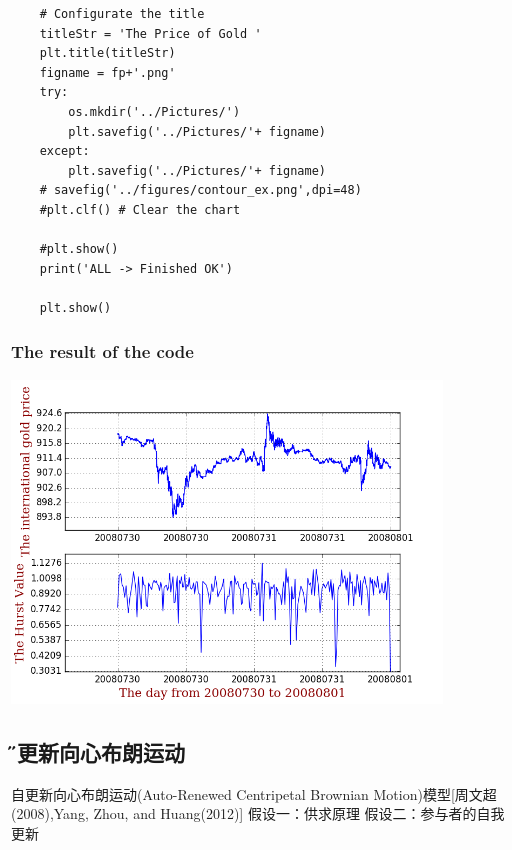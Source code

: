 \documentclass[12pt]{article}
\begin{document}
\begin{lstlisting}
    # Configurate the title
    titleStr = 'The Price of Gold '
    plt.title(titleStr)
    figname = fp+'.png'
    try:
        os.mkdir('../Pictures/')
        plt.savefig('../Pictures/'+ figname)
    except:
        plt.savefig('../Pictures/'+ figname)
    # savefig('../figures/contour_ex.png',dpi=48)
    #plt.clf() # Clear the chart

    #plt.show()
    print('ALL -> Finished OK')

    plt.show()
\end{lstlisting}

\subsubsection{The result of the code}
\includegraphics[width=4.5in]{6.png}


\subsection{\H 自更新向心布朗运动}
自更新向心布朗运动(Auto-Renewed Centripetal Brownian Motion)模型[周文超(2008),Yang, Zhou, and Huang(2012)]
假设一：供求原理
假设二：参与者的自我更新
\end{document}
